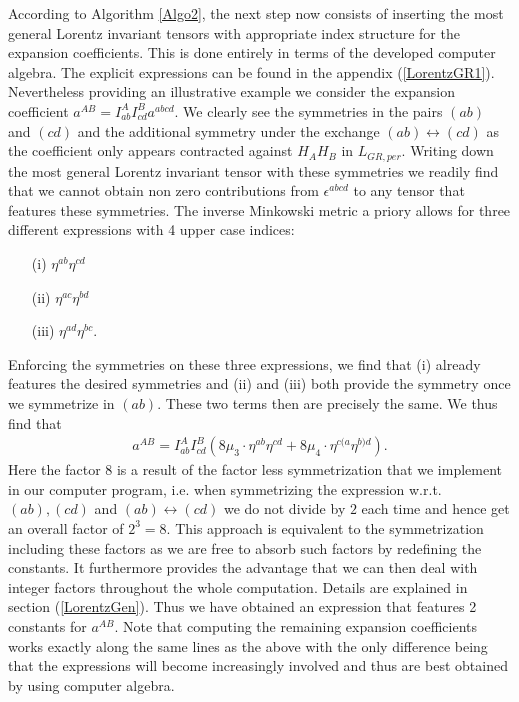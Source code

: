 \documentclass[a4paper,12pt, DIV=14, BCOR=5mm, twoside, headsepline, numbers=noenddot]{scrbook}
\begin{document}
According to Algorithm \ref{Algo2}, the next step now consists of inserting the most general Lorentz invariant tensors with appropriate index structure for the expansion coefficients. This is done entirely in terms of the developed computer algebra. The explicit expressions can be found in the appendix (\ref{LorentzGR1}).
Nevertheless providing an illustrative example we consider the expansion coefficient $a^{AB} = I^{A}_{ab}I^{B}_{cd}a^{abcd}$. We clearly see the symmetries in the pairs $(ab)$ and $(cd)$ and the additional symmetry under the exchange $(ab) \leftrightarrow (cd)$ as the coefficient only appears contracted against $H_AH_B$ in $L_{GR,per}$. Writing down the most general Lorentz invariant tensor with these symmetries we readily find that we cannot obtain non zero contributions from $\epsilon^{abcd}$ to any tensor that features these symmetries. The inverse Minkowski metric a priory allows for three different expressions with 4 upper case indices:
\begin{itemize}
    \item[(i)] $\eta^{ab} \eta^{cd}$ 
    \item[(ii)] $\eta^{ac} \eta^{bd}$ 
    \item[(iii)] $\eta^{ad} \eta^{bc}$.
\end{itemize}
Enforcing the symmetries on these three expressions, we find that (i) already features the desired symmetries and (ii) and (iii) both provide the symmetry once we symmetrize in $(ab)$. These two terms then are precisely the same. We thus find that 
\begin{align}\label{ansatzExample}
    a^{AB} = I^{A}_{ab}I^{B}_{cd} \left ( 8\mu_3 \cdot \eta^{ab}\eta^{cd} + 8\mu_4 \cdot \eta^{c(a} \eta^{b)d}   \right ).
\end{align}
Here the factor $8$ is a result of the factor less symmetrization that we implement in our computer program, i.e. when symmetrizing the expression w.r.t. $(ab),(cd)$ and $(ab) \leftrightarrow (cd) $ we do not divide by $2$ each time and hence get an overall factor of $2^3=8$. This approach is equivalent to the symmetrization including these factors as we are free to absorb such factors by redefining the constants. It furthermore provides the advantage that we can then deal with integer factors throughout the whole computation. Details are explained in section (\ref{LorentzGen}).
Thus we have obtained an expression that features 2 constants for $a^{AB}$.
Note that computing the remaining expansion coefficients works exactly along the same lines as the above with the only difference being that the expressions will become increasingly involved and thus are best obtained by using computer algebra.
\end{document}
